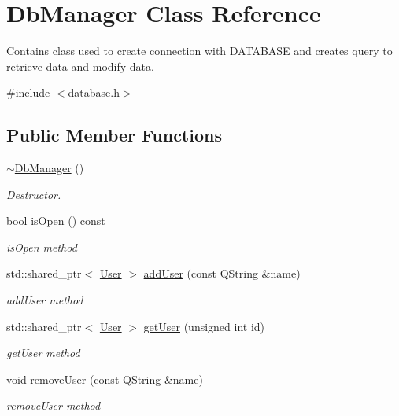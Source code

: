\hypertarget{class_db_manager}{}\section{Db\+Manager Class Reference}
\label{class_db_manager}


Contains class used to create connection with D\+A\+T\+A\+B\+A\+SE and creates query to retrieve data and modify data.  




{\ttfamily \#include $<$database.\+h$>$}

\subsection*{Public Member Functions}
\begin{DoxyCompactItemize}
\item 
\hyperlink{class_db_manager_ac5cdf8e5e932d1681ab807d8f256374c}{$\sim$\+Db\+Manager} ()
\begin{DoxyCompactList}\small\item\em Destructor. \end{DoxyCompactList}\item 
bool \hyperlink{class_db_manager_ac04baba8f5d5197f8bcd9230393501de}{is\+Open} () const
\begin{DoxyCompactList}\small\item\em is\+Open method \end{DoxyCompactList}\item 
std\+::shared\+\_\+ptr$<$ \hyperlink{class_user}{User} $>$ \hyperlink{class_db_manager_afab938045b88229acbe9463f45289961}{add\+User} (const Q\+String \&name)
\begin{DoxyCompactList}\small\item\em add\+User method \end{DoxyCompactList}\item 
std\+::shared\+\_\+ptr$<$ \hyperlink{class_user}{User} $>$ \hyperlink{class_db_manager_aca4a4621da1651f4da64adddd9811cb1}{get\+User} (unsigned int id)
\begin{DoxyCompactList}\small\item\em get\+User method \end{DoxyCompactList}\item 
void \hyperlink{class_db_manager_a9a22cf827ee9cf0ba7b70ffea81c92e1}{remove\+User} (const Q\+String \&name)
\begin{DoxyCompactList}\small\item\em remove\+User method \end{DoxyCompactList}\item 

\end{DoxyCompactItemize}
